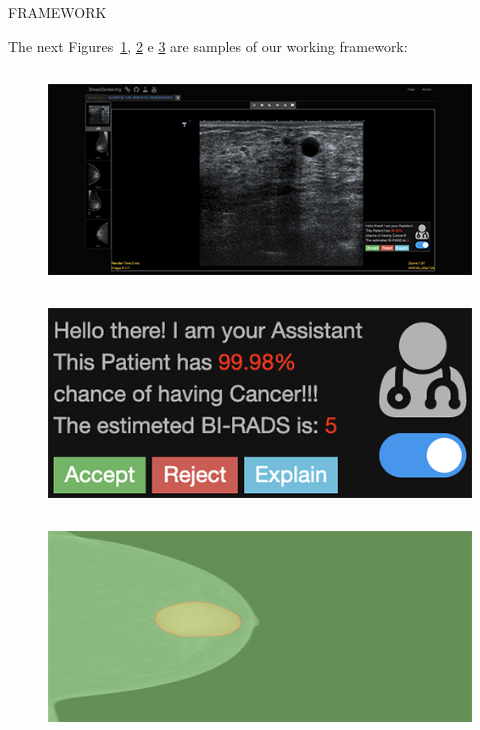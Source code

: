 \documentclass[final]{beamer}
\begin{document}
\begin{frame}[t, fragile = singleslide]{}
\begin{columns}[t]
\end{columns}

\begin{columns}[t]

\begin{column}{0.945\textwidth}

\begin{block}{FRAMEWORK}

The next Figures~\ref{fig:fig002}, \ref{fig:fig003} e \ref{fig:fig004} are samples of our working framework:

\begin{column}[T]{0.33\textwidth}
\begin{figure}[!htb]
\centering
\caption{}
\label{fig:fig002}
\includegraphics[width = 0.75\columnwidth]{./figures/fig002}
\end{figure}
\end{column}
{\color{PosterBars}\vrule width 1.5pt}
\begin{column}[T]{0.33\textwidth}
\begin{figure}[!htb]
\centering
\caption{}
\label{fig:fig003}
\includegraphics[width = 0.75\columnwidth]{./figures/fig003}
\end{figure}
\end{column}
{\color{PosterBars}\vrule width 1.5pt}
\begin{column}[T]{0.33\textwidth}
\begin{figure}[!htb]
\centering
\caption{}
\label{fig:fig004}
\includegraphics[width = 0.75\columnwidth]{./figures/fig004}
\end{figure}
\end{column}


\end{block}
\end{column}
\end{columns}
\end{frame}
\end{document}
